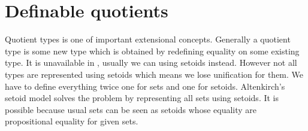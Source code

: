 \documentclass{article}
\begin{document}
\section{Definable quotients}

Quotient types is one of important extensional concepts\cite{hot:phd}. Generally a quotient type is some new type which is obtained by redefining equality on some existing type. It is unavailable in \itt{}, usually we can using setoids instead. However not all types are represented using setoids which means we lose unification for them. We have to define everything twice one for sets and one for setoids. Altenkirch's setoid model solves the problem by representing all sets using setoids. It is possible because usual sets can be seen as setoids whose equality are propositional equality for given sets.







\end{document}
